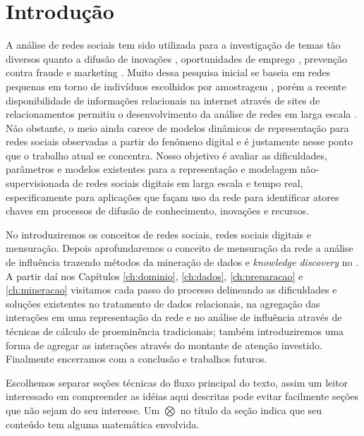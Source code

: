 \chapter{Introdução}
\label{ch:introducao}
A análise de redes sociais tem sido utilizada para a investigação
de temas tão diversos quanto a difusão de inovações \citep{Coleman1966},
oportunidades de emprego \citep{Granovetter1995}, prevenção contra fraude
\citep{Neville2005} e marketing \citep{Domingos2001}. Muito dessa pesquisa
inicial se baseia em redes pequenas em torno de indivíduos escolhidos por amostragem
\citep{Wasserman}\citep{Newman2006}, porém a recente disponibilidade de
informações relacionais na internet através de sites de relacionamentos permitiu o
desenvolvimento da análise de redes em larga escala \citep{Boyd2007}. Não
obstante, o meio ainda carece de modelos dinâmicos de representação para redes
sociais observadas a partir do fenômeno digital \citep{Xiang2010} e é justamente
nesse ponto que o trabalho atual se concentra. Nosso objetivo é avaliar as
dificuldades, parâmetros e modelos existentes para a representação e modelagem
não-supervisionada de redes sociais digitais em larga escala e tempo real,
especificamente para aplicações que façam uso da rede para identificar atores
chaves em processos de difusão de conhecimento, inovações e recursos.

No  introduziremos os conceitos de redes sociais, redes sociais
digitais e mensuração. Depois aprofundaremos o conceito de mensuração da rede a
análise de influência trazendo métodos da mineração de dados e \emph{knowledge
discovery} no . A partir daí nos Capítulos \ref{ch:dominio},
\ref{ch:dados}, \ref{ch:preparacao} e \ref{ch:mineracao} visitamos cada passo do
processo delineando as dificuldades e soluções existentes no tratamento de dados
relacionais, na agregação das interações em uma representação da rede e no
análise de influência através de técnicas de cálculo de proeminência
tradicionais; também introduziremos uma forma de agregar as interações através do
montante de atenção investido. Finalmente encerramos com a conclusão e trabalhos
futuros.

Escolhemos separar seções técnicas do fluxo principal do texto, assim um leitor
interessado em compreender as idéias aqui descritas pode evitar facilmente
seções que não sejam do seu interesse. Um $\bigotimes$ no título da seção indica
que seu conteúdo tem alguma matemática envolvida.

